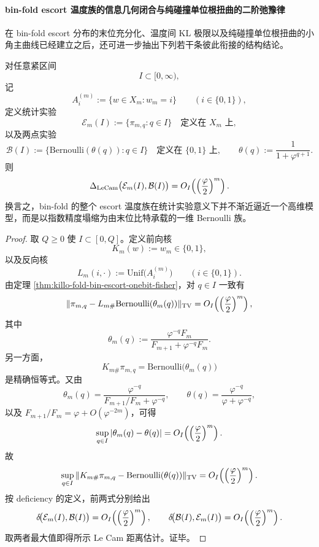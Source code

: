 \paragraph{bin-fold escort 温度族的信息几何闭合与纯碰撞单位根扭曲的二阶弛豫律}
在 bin-fold escort 分布的末位充分化、温度间 KL 极限以及纯碰撞单位根扭曲的小角主曲线已经建立之后，还可进一步抽出下列若干条彼此衔接的结构结论。

\begin{theorem}\label{con:xi-time-part9o-escort-blackwell-collapse}
对任意紧区间
\[
I\subset [0,\infty),
\]
记
\[
A_i^{(m)}:=\{w\in X_m:w_m=i\}
\qquad (i\in\{0,1\}),
\]
定义统计实验
\[
\mathcal E_m(I):=\{\pi_{m,q}:q\in I\}\quad\text{定义在 }X_m\text{ 上},
\]
以及两点实验
\[
\mathcal B(I):=\{\mathrm{Bernoulli}(\theta(q)):q\in I\}\quad\text{定义在 }\{0,1\}\text{ 上},
\qquad
\theta(q):=\frac{1}{1+\varphi^{q+1}}.
\]
则
\[
\Delta_{\mathrm{LeCam}}\bigl(\mathcal E_m(I),\mathcal B(I)\bigr)
=
O_I\!\left(\Bigl(\frac{\varphi}{2}\Bigr)^m\right).
\]
换言之，bin-fold 的整个 escort 温度族在统计实验意义下并不渐近逼近一个高维模型，而是以指数精度塌缩为由末位比特承载的一维 Bernoulli 族。
\end{theorem}
\begin{proof}
取 \(Q\ge 0\) 使 \(I\subset[0,Q]\)。定义前向核
\[
K_m(w):=w_m\in\{0,1\},
\]
以及反向核
\[
L_m(i,\cdot):=\mathrm{Unif}\bigl(A_i^{(m)}\bigr)
\qquad (i\in\{0,1\}).
\]
由定理 \ref{thm:killo-fold-bin-escort-onebit-fisher}，对 \(q\in I\) 一致有
\[
\|\pi_{m,q}-L_{m\#}\mathrm{Bernoulli}(\theta_m(q))\|_{\mathrm{TV}}
=
O_I\!\left(\Bigl(\frac{\varphi}{2}\Bigr)^m\right),
\]
其中
\[
\theta_m(q):=
\frac{\varphi^{-q}F_m}{F_{m+1}+\varphi^{-q}F_m}.
\]
另一方面，
\[
K_{m\#}\pi_{m,q}
=
\mathrm{Bernoulli}\!\bigl(\theta_m(q)\bigr)
\]
是精确恒等式。又由
\[
\theta_m(q)
=
\frac{\varphi^{-q}}{F_{m+1}/F_m+\varphi^{-q}},
\qquad
\theta(q)
=
\frac{\varphi^{-q}}{\varphi+\varphi^{-q}},
\]
以及 \(F_{m+1}/F_m=\varphi+O(\varphi^{-2m})\)，可得
\[
\sup_{q\in I}|\theta_m(q)-\theta(q)|
=
O_I\!\left(\Bigl(\frac{\varphi}{2}\Bigr)^m\right).
\]
故
\[
\sup_{q\in I}
\|K_{m\#}\pi_{m,q}-\mathrm{Bernoulli}(\theta(q))\|_{\mathrm{TV}}
=
O_I\!\left(\Bigl(\frac{\varphi}{2}\Bigr)^m\right).
\]
按 deficiency 的定义，前两式分别给出
\[
\delta\!\bigl(\mathcal E_m(I),\mathcal B(I)\bigr)
=
O_I\!\left(\Bigl(\frac{\varphi}{2}\Bigr)^m\right),
\qquad
\delta\!\bigl(\mathcal B(I),\mathcal E_m(I)\bigr)
=
O_I\!\left(\Bigl(\frac{\varphi}{2}\Bigr)^m\right).
\]
取两者最大值即得所示 Le Cam 距离估计。证毕。
\end{proof}

